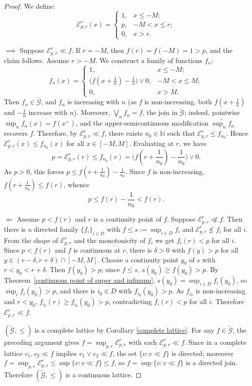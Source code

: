 \documentclass[preprint,3p,times]{elsarticle}
\theoremstyle{plain}
\theoremstyle{definition}
\numberwithin{equation}{section}
\begin{document}
\begin{proof}
We define:
\[
\mathcal{E}^r_{p,r}(x)=\begin{cases}
	1, & x\le -M;\\
	p, & -M<x\le r;\\
	0, & x>r.
\end{cases}
\]

\(\implies\) Suppose \(\mathcal{E}^r_{p,r}\ll f\). If \(r=-M\), then \(f(r)=f(-M)=1>p\), and the claim follows. Assume \(r>-M\). We construct a family of functions \(f_n\):
\[
f_n(x)=\begin{cases}
	1, & x\le -M;\\
	\bigl(f(x+\frac{1}{n})-\frac{1}{n}\bigr)\vee 0, & -M<x\le M;\\
	0, & x>M.
\end{cases}
\]
Then \(f_n\in\tilde{\mathcal{G}}\), and \(f_n\) is increasing with \(n\) (as \(f\) is non-increasing, both \(f(x+\frac{1}{n})\) and \(-\frac{1}{n}\) increase with \(n\)). Moreover, \(\bigvee_n f_n=f\), the join in \(\tilde{\mathcal{G}}\); indeed, pointwise \(\sup_n f_n(x)=f(x^+)\), and the upper-semicontinuous modification \(\widetilde{\sup_n f_n}\) recovers \(f\). Therefore, by \(\mathcal{E}^r_{p,r}\ll f\), there exists \(n_0\in\mathbb{N}\) such that \(\mathcal{E}^r_{p,r}\le f_{n_0}\). Hence \(\mathcal{E}^r_{p,r}(x)\le f_{n_0}(x)\) for all \(x\in[-M,M]\). Evaluating at \(r\), we have
\[
p=\mathcal{E}^r_{p,r}(r)\le f_{n_0}(r)=\bigl(f(r+\frac{1}{n_0})-\frac{1}{n_0}\bigr)\vee 0.
\]
As \(p>0\), this forces \(p\le f(r+\frac{1}{n_0})-\frac{1}{n_0}\). Since \(f\) is non-increasing, \(f(r+\frac{1}{n_0})\le f(r)\), whence
\[
p\le f(r)-\frac{1}{n_0}<f(r).
\]

$\Leftarrow$  Assume \(p<f(r)\) and \(r\) is a continuity point of \(f\). Suppose \(\mathcal{E}^r_{p,r}\not\ll f\). Then there is a directed family \(\{f_i\}_{i\in D}\) with \(f\le s:=\sup_{i\in D}f_i\) and \(\mathcal{E}^r_{p,r}\nleq f_i\) for all \(i\). From the shape of \(\mathcal{E}^r_{p,r}\) and the monotonicity of \(f_i\) we get \(f_i(r)<p\) for all \(i\). Since \(p<f(r)\) and \(f\) is continuous at \(r\), there is \(\delta>0\) with \(f(y)>p\) for all \(y\in(r-\delta,r+\delta)\cap[-M,M]\). Choose a continuity point \(y_0\) of \(s\) with \(r<y_0<r+\delta\). Then \(f(y_0)>p\); since \(f\le s\), \(s(y_0)\ge f(y_0)>p\). By Theorem~\ref{continuous point of super and infimum}, \(s(y_0)=\sup_{i\in D}f_i(y_0)\), so \(\sup_i f_i(y_0)>p\), and there is \(i_0\in D\) with \(f_{i_0}(y_0)>p\). As \(f_{i_0}\) is non-increasing and \(r<y_0\), \(f_{i_0}(r)\ge f_{i_0}(y_0)>p\), contradicting \(f_i(r)<p\) for all \(i\). Therefore \(\mathcal{E}^r_{p,r}\ll f\).

\((\tilde{\mathcal{G}},\le)\) is a complete lattice by Corollary \ref{complete lattice}.
For any \(f\in\tilde{\mathcal{G}}\), the preceding argument gives
\(f=\sup_{p,r}\mathcal{E}^r_{p,r}\) with each \(\mathcal{E}^r_{p,r}\ll f\). Since in a
complete lattice \(v_1,v_2\ll f\) implies \(v_1\vee v_2\ll f\), the set
\(\{v:v\ll f\}\) is directed; moreover
\(f=\sup_{p,r}\mathcal{E}^r_{p,r}\le\sup\{v:v\ll f\}\le f\), so \(f=\sup\{v:v\ll f\}\)
is a directed join. Therefore \((\tilde{\mathcal{G}},\le)\) is a continuous lattice.

\end{proof}
\end{document}
